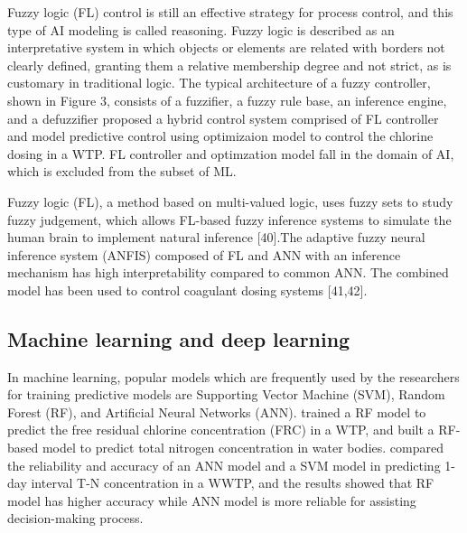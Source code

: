 Fuzzy logic (FL) control is still an effective strategy for process control, and this type of AI modeling is called reasoning. Fuzzy logic is described as an interpretative system in which objects or elements are related with borders not clearly defined, granting them a relative membership degree and not strict, as is customary in traditional logic. The typical architecture of a fuzzy controller, shown in Figure 3, consists of a fuzzifier, a fuzzy rule base, an inference engine, and a defuzzifier \citet{santinFuzzyControlModel2015} proposed a hybrid control system comprised of FL controller and model predictive control using optimizaion model to control the chlorine dosing in a WTP. FL controller and optimzation model fall in the domain of AI, which is excluded from the subset of ML.

Fuzzy logic (FL), a method based on multi-valued logic, uses fuzzy sets to study fuzzy judgement, which allows FL-based fuzzy inference systems to simulate the human brain to implement natural inference [40].The adaptive fuzzy neural inference system (ANFIS) composed of FL and ANN with an inference mechanism has high interpretability compared to common ANN. The combined model has been used to control coagulant dosing systems [41,42].

\subsection{Machine learning and deep learning}
In machine learning, popular models which are frequently used by the researchers for training predictive models are Supporting Vector Machine (SVM), Random Forest (RF), and Artificial Neural Networks (ANN). \citet{librantzArtificialNeuralNetworks2018} trained a RF model to predict the free residual chlorine concentration (FRC) in a WTP, and \citet{xuAlternativeLaboratoryTesting2021} built a RF-based model to predict total nitrogen concentration in water bodies. \citet{guoPredictionEffluentConcentration2015} compared the reliability and accuracy of an ANN model and a SVM model in predicting 1-day interval T-N concentration in a WWTP, and the results showed that RF model has higher accuracy while ANN model is more reliable for assisting decision-making process.

